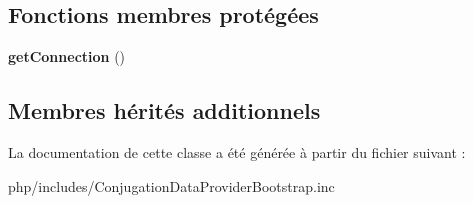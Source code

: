 \subsection*{Fonctions membres protégées}
\begin{DoxyCompactItemize}
\item 
\hypertarget{classConjugationDataProviderBootstrap_a253604839693a34eb29b54e9356e40ab}{}\label{classConjugationDataProviderBootstrap_a253604839693a34eb29b54e9356e40ab} 
{\bfseries get\+Connection} ()
\end{DoxyCompactItemize}
\subsection*{Membres hérités additionnels}


La documentation de cette classe a été générée à partir du fichier suivant \+:\begin{DoxyCompactItemize}
\item 
php/includes/Conjugation\+Data\+Provider\+Bootstrap.\+inc\end{DoxyCompactItemize}
